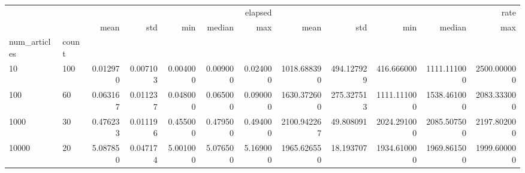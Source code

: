 \begin{tabular}{llrrrrrrrrrr}
 &  & \multicolumn{5}{r}{elapsed} & \multicolumn{5}{r}{rate} \\
 &  & mean & std & min & median & max & mean & std & min & median & max \\
num_articles & count &  &  &  &  &  &  &  &  &  &  \\
10 & 100 & 0.012970 & 0.007103 & 0.004000 & 0.009000 & 0.024000 & 1018.688390 & 494.127929 & 416.666000 & 1111.111000 & 2500.000000 \\
100 & 60 & 0.063167 & 0.011237 & 0.048000 & 0.065000 & 0.090000 & 1630.372600 & 275.327513 & 1111.111000 & 1538.461000 & 2083.333000 \\
1000 & 30 & 0.476233 & 0.011196 & 0.455000 & 0.479500 & 0.494000 & 2100.942267 & 49.808091 & 2024.291000 & 2085.507500 & 2197.802000 \\
10000 & 20 & 5.087850 & 0.047174 & 5.001000 & 5.076500 & 5.169000 & 1965.626550 & 18.193707 & 1934.610000 & 1969.861500 & 1999.600000 \\
\end{tabular}
